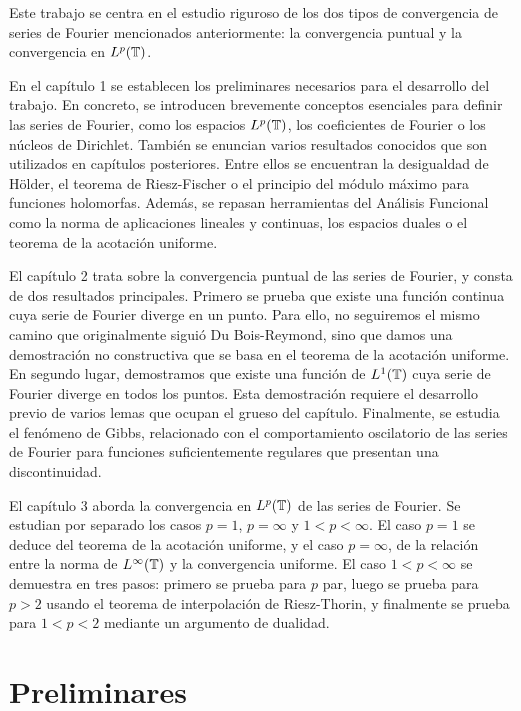 \documentclass[a4paper, 12pt]{book}
\begin{document}
Este trabajo se centra en el estudio riguroso de los dos tipos de convergencia de series de Fourier mencionados anteriormente: la convergencia puntual y la convergencia en $L^p(\mathbb T)$. 

En el capítulo 1 se establecen los preliminares necesarios para el desarrollo del trabajo. En concreto, se introducen brevemente conceptos esenciales para definir las series de Fourier, como los espacios $L^p(\mathbb T)$, los coeficientes de Fourier o los núcleos de Dirichlet. También se enuncian varios resultados conocidos que son utilizados en capítulos posteriores. Entre ellos se encuentran la desigualdad de Hölder, el teorema de Riesz-Fischer o el principio del módulo máximo para funciones holomorfas. Además, se repasan herramientas del Análisis Funcional como la norma de aplicaciones lineales y continuas, los espacios duales o el teorema de la acotación uniforme.

El capítulo 2 trata sobre la convergencia puntual de las series de Fourier, y consta de dos resultados principales. Primero se prueba que existe una función continua cuya serie de Fourier diverge en un punto. Para ello, no seguiremos el mismo camino que originalmente siguió Du Bois-Reymond, sino que damos una demostración no constructiva que se basa en el teorema de la acotación uniforme. En segundo lugar, demostramos que existe una función de $L^1(\mathbb T)$ cuya serie de Fourier diverge en todos los puntos. Esta demostración requiere el desarrollo previo de varios lemas que ocupan el grueso del capítulo. Finalmente, se estudia el fenómeno de Gibbs, relacionado con el comportamiento oscilatorio de las series de Fourier para funciones suficientemente regulares que presentan una discontinuidad.

El capítulo 3 aborda la convergencia en $L^p(\mathbb T)$ de las series de Fourier. Se estudian por separado los casos $p = 1$, $p = \infty$ y $1<p<\infty$. El caso $p = 1$ se deduce del teorema de la acotación uniforme, y el caso $p = \infty$, de la relación entre la norma de $L^\infty(\mathbb T)$ y la convergencia uniforme. El caso $1<p<\infty$ se demuestra en tres pasos: primero se prueba para $p$ par, luego se prueba para $p > 2$ usando el teorema de interpolación de Riesz-Thorin, y finalmente se prueba para $1<p<2$ mediante un argumento de dualidad.



\chapter{Preliminares}
\end{document}

